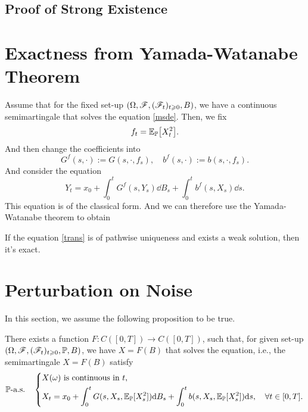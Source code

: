 \documentclass[8pt,onesided]{article}
\begin{document}
\subsection{Proof of Strong Existence}

\section{Exactness from Yamada-Watanabe Theorem}

Assume that for the fixed set-up $(\Omega, \mathscr{F}, (\mathscr{F}_t)_{t\geqslant 0}, B)$, we have a continuous semimartingale that solves the equation \ref{msde}. Then, we fix
\begin{equation*}
    f_t=\mathbb{E}_{\mathbb{P}}\big[ X_t^2\big].
\end{equation*}
And then change the coefficients into
\begin{equation*}
    G^{f}(s, \cdot):=G(s, \cdot, f_s), \quad b^{f}(s, \cdot):=b(s, \cdot, f_s).
\end{equation*}
And consider the equation
\begin{equation}
    \label{trans}
     Y_t=x_0+\int_0^t G^f(s,Y_s) \dd B_s+\int_0^t b^f(s,X_s) \dd s.
\end{equation}
This equation is of the classical form. And we can therefore use the Yamada-Watanabe theorem to obtain
\begin{theorem}
    If the equation \ref{trans} is of pathwise uniqueness and exists a weak solution, then it's exact. 
\end{theorem}



\section{Perturbation on Noise}

In this section, we assume the following proposition to be true.
 
\begin{proposition}
There exists a function $F:C([0,T])\to C([0,T])$, such that, for given set-up $(\Omega, \mathscr{F}, (\mathscr{F}_t)_{t\geqslant0}, \mathbb{P}, B)$, we have $X=F(B)$ that solves the equation, i.e., the semimartingale $X=F(B)$ satisfy
\begin{equation*}
    \mathbb{P}\text{-a.s.}\quad \left\{
    \begin{aligned}
        &X(\omega) \text{ is continuous in }t,\\    
        &X_t=x_0+\int_0^t G(s,X_s,\mathbb{E}_{\mathbb{P}}[X_s^2]) \dd B_s+\int_0^t b(s,X_s,\mathbb{E}_{\mathbb{P}}[X_s^2]) \dd s,\quad \forall t\in[0,T].
    \end{aligned}
    \right.
\end{equation*}
\end{proposition}
\end{document}
